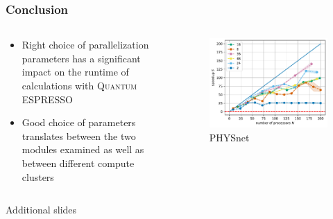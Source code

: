 \documentclass[aspectratio=169]{beamer}
\newcommand{\QE}{\textsc{Quantum} ESPRESSO\xspace}
\begin{document}

\begin{frame}
	\frametitle{Conclusion}


	\begin{columns}
		\begin{column}{0.5\textwidth}
			\begin{itemize}
				\item Right choice of parallelization parameters has a significant impact on the runtime of calculations with \QE
				\item Good choice of parameters translates between the two modules examined as well as between different compute clusters
			\end{itemize}
		\end{column}
		\begin{column}{0.5\textwidth}
			\begin{figure}
				\includegraphics[width=\textwidth]{figs/TaS2_intel_bench_nk_speedup.pdf}
				\caption*{PHYSnet}
			\end{figure}
		\end{column}
	\end{columns}

\end{frame}


\begin{frame}
	\centering
	{\huge Additional slides}
\end{frame}

\end{document}
